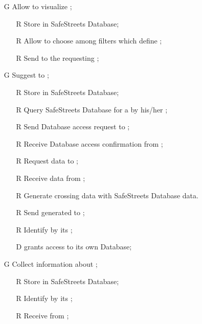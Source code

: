 \documentclass[../../../rasd.tex]{subfiles}
\begin{document}
\begin{itemize}
	\item[G\subs{5}]Allow  to visualize ;
	\begin{itemize}
		\item[R\subs{10}]Store  in SafeStreets Database;
		\item[R\subs{23}]Allow  to choose among filters which define ;
		\item[R\subs{24}]Send  to the requesting ;
	\end{itemize}

	\item[G\subs{6}]Suggest  to ;
	\begin{itemize}
		\item[R\subs{10}]Store  in SafeStreets Database;
		\item[R\subs{13}]Query SafeStreets Database for a  by his/her ;
		\item[R\subs{25}]Send  Database access request to ; 
		\item[R\subs{26}]Receive  Database access confirmation from ;
		\item[R\subs{27}]Request  data to ;
		\item[R\subs{28}]Receive  data from ;
		\item[R\subs{29}]Generate  crossing   data with SafeStreets Database data.
		\item[R\subs{30}]Send generated  to ;
		\item[R\subs{31}]Identify  by its ;
		\\
		\item[D\subs{8}] grants access to its own  Database;
	\end{itemize}

	\item[G\subs{7}]Collect information about ;
	\begin{itemize}
		\item[R\subs{12}]Store  in SafeStreets Database;
		\item[R\subs{31}]Identify  by its ;
		\item[R\subs{32}]Receive  from ;
	\end{itemize}


\end{itemize}
\end{document}
